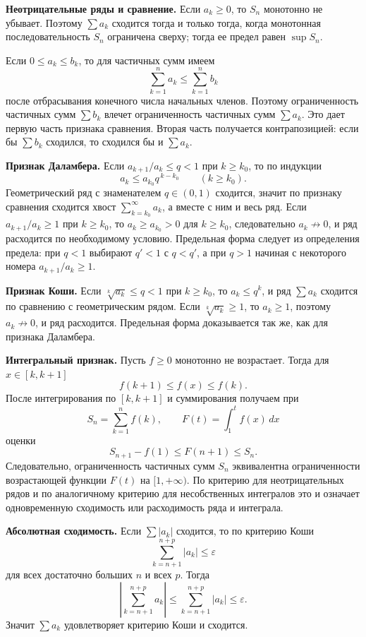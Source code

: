 \documentclass[12pt,a4paper]{article}
\newcommand{\eps}{\varepsilon}
\begin{document}
\textbf{Неотрицательные ряды и сравнение.}
Если \(a_k\ge0\), то \(S_n\) монотонно не убывает. Поэтому
\(\sum a_k\) сходится тогда и только тогда, когда монотонная
последовательность \(S_n\) ограничена сверху; тогда ее предел равен
\(\sup S_n\).

Если \(0\le a_k\le b_k\), то для частичных сумм имеем
\[
  \sum_{k=1}^{n}a_k\le\sum_{k=1}^{n}b_k
\]
после отбрасывания конечного числа начальных членов. Поэтому ограниченность
частичных сумм \(\sum b_k\) влечет ограниченность частичных сумм \(\sum a_k\).
Это дает первую часть признака сравнения. Вторая часть получается
контрапозицией: если бы \(\sum b_k\) сходился, то сходился бы и \(\sum a_k\).

\textbf{Признак Даламбера.}
Если \(a_{k+1}/a_k\le q<1\) при \(k\ge k_0\), то по индукции
\[
  a_k\le a_{k_0}q^{\,k-k_0}\qquad (k\ge k_0).
\]
Геометрический ряд с знаменателем \(q\in(0,1)\) сходится, значит по признаку
сравнения сходится хвост \(\sum_{k=k_0}^{\infty}a_k\), а вместе с ним и весь
ряд. Если \(a_{k+1}/a_k\ge1\) при \(k\ge k_0\), то \(a_k\ge a_{k_0}>0\) для
\(k\ge k_0\), следовательно \(a_k\not\to0\), и ряд расходится по необходимому
условию. Предельная форма следует из определения предела: при \(q<1\)
выбирают \(q'<1\) с \(q<q'\), а при \(q>1\) начиная с некоторого номера
\(a_{k+1}/a_k\ge1\).

\textbf{Признак Коши.}
Если \(\sqrt[k]{a_k}\le q<1\) при \(k\ge k_0\), то \(a_k\le q^k\), и ряд
\(\sum a_k\) сходится по сравнению с геометрическим рядом. Если
\(\sqrt[k]{a_k}\ge1\), то \(a_k\ge1\), поэтому \(a_k\not\to0\), и ряд
расходится. Предельная форма доказывается так же, как для признака
Даламбера.

\textbf{Интегральный признак.}
Пусть \(f\ge0\) монотонно не возрастает. Тогда для \(x\in[k,k+1]\)
\[
  f(k+1)\le f(x)\le f(k).
\]
После интегрирования по \([k,k+1]\) и суммирования получаем при
\[
  S_n=\sum_{k=1}^{n}f(k),\qquad F(t)=\int_1^t f(x)\,dx
\]
оценки
\[
  S_{n+1}-f(1)\le F(n+1)\le S_n.
\]
Следовательно, ограниченность частичных сумм \(S_n\) эквивалентна
ограниченности возрастающей функции \(F(t)\) на \([1,+\infty)\). По критерию
для неотрицательных рядов и по аналогичному критерию для несобственных
интегралов это и означает одновременную сходимость или расходимость ряда и
интеграла.

\textbf{Абсолютная сходимость.}
Если \(\sum |a_k|\) сходится, то по критерию Коши
\[
  \sum_{k=n+1}^{n+p}|a_k|\le\eps
\]
для всех достаточно больших \(n\) и всех \(p\). Тогда
\[
  \left|\sum_{k=n+1}^{n+p}a_k\right|
  \le
  \sum_{k=n+1}^{n+p}|a_k|
  \le \eps.
\]
Значит \(\sum a_k\) удовлетворяет критерию Коши и сходится.
\end{document}
